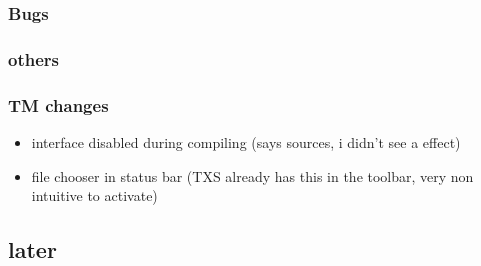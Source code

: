 \documentclass[10pt,a4paper,landscape]{report}
\begin{document}
\subsubsection{Bugs}

\subsubsection{others}

\subsubsection{TM changes}

\begin{itemize}
\item interface disabled during compiling (says sources, i didn't see a effect)
\item file chooser in status bar (TXS already has this in the toolbar, very non intuitive to activate)
\end{itemize}

\subsection{later}
\end{document}
